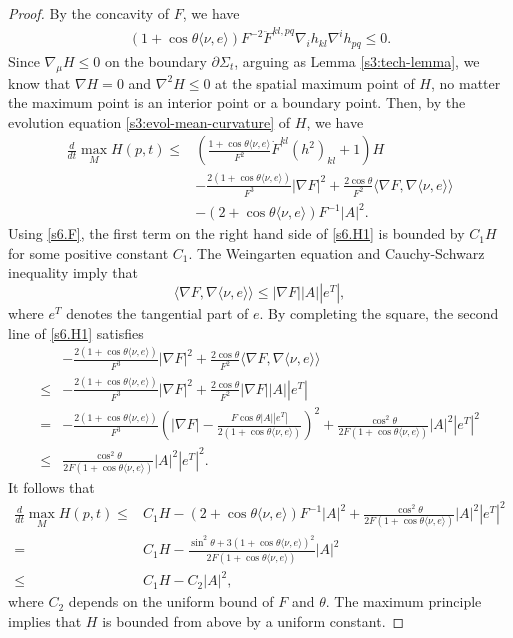 \documentclass[11pt,reqno]{amsart}
\theoremstyle{definition}
\theoremstyle{remark}
\numberwithin{equation}{section}
\renewcommand{\(}{\left(}
\renewcommand{\)}{\right)}
\renewcommand{\-}{\overline}
\renewcommand{\t}{\theta}
\begin{document}
\begin{proof}
By the concavity of $F$, we have
	\begin{align*}
    (1+\cos\t\langle \nu,e\rangle) F^{-2}\ddot{F}^{kl,pq}\nabla_i h_{kl}\nabla^i h_{pq}\leq 0.
	\end{align*}
Since $\nabla_\mu H\leq 0$ on the boundary $\partial\Sigma_t$, arguing as Lemma \ref{s3:tech-lemma}, we know that $\nabla H=0$ and $\nabla^2H\leq 0$ at the spatial maximum point of $H$, no matter the maximum point is an interior point or a boundary point. Then, by the evolution equation \eqref{s3:evol-mean-curvature} of $H$, we have
	\begin{align}\label{s6.H1}
	\frac{d}{dt}\max_{M}H(p,t) \leq &\(\frac{1+\cos\t \langle \nu,e\rangle}{F^2}\dot{F}^{kl}(h^2)_{kl}+1\)H \nonumber\\
	&-\frac{2(1+\cos\t\langle \nu,e\rangle)}{F^3}|\nabla F|^2+\frac{2\cos\t}{F^2}\langle \nabla F, \nabla\langle \nu,e\rangle\rangle \nonumber\\
	&-(2+\cos\t \langle \nu,e\rangle) F^{-1}|A|^2.
	\end{align}
	Using \eqref{s6.F}, the first term on the right hand side of \eqref{s6.H1} is bounded by $C_1H$ for some positive constant $C_1$. The Weingarten equation and Cauchy-Schwarz inequality imply that
\begin{equation*}
  \langle \nabla F, \nabla\langle \nu,e\rangle\rangle \leq |\nabla F||A||e^T|,
\end{equation*}
where $e^T$ denotes the tangential part of $e$. By completing the square, the second line of \eqref{s6.H1} satisfies
	\begin{align*}
	 &-\frac{2(1+\cos\t\langle \nu,e\rangle)}{F^3}|\nabla F|^2+\frac{2\cos\t}{F^2}\langle \nabla F, \nabla\langle \nu,e\rangle\rangle \\
	\leq &-\frac{2(1+\cos\t\langle \nu,e\rangle)}{F^3}|\nabla F|^2+\frac{2\cos\t}{F^2}|\nabla F||A||e^T|\\
=&-\frac{2(1+\cos\t\langle \nu,e\rangle)}{F^3}\left(|\nabla F|-\frac{F\cos\theta |A||e^T|}{2(1+\cos\t\langle \nu,e\rangle)}\right)^2+\frac{\cos^2\theta}{2F(1+\cos\t\langle \nu,e\rangle)}|A|^2|e^T|^2\\
	\leq &\frac{\cos^2\theta}{2F(1+\cos\t\langle \nu,e\rangle)}|A|^2|e^T|^2.
	\end{align*}
It follows that
\begin{align*}
  \frac{d}{dt}\max_{M}H(p,t) \leq & C_1H -(2+\cos\t \langle \nu,e\rangle) F^{-1}|A|^2+\frac{\cos^2\theta}{2F(1+\cos\t\langle \nu,e\rangle)}|A|^2|e^T|^2\\
  = & C_1H-\frac{\sin^2\theta+3(1+\cos\theta\langle \nu,e\rangle)^2}{2F(1+\cos\t\langle \nu,e\rangle)}|A|^2\\
  \leq &C_1H-C_2|A|^2,
\end{align*}
where $C_2$ depends on the uniform bound of $F$ and $\theta$.  The maximum principle implies that $H$ is bounded from above by a uniform constant.
\end{proof}
\end{document}
